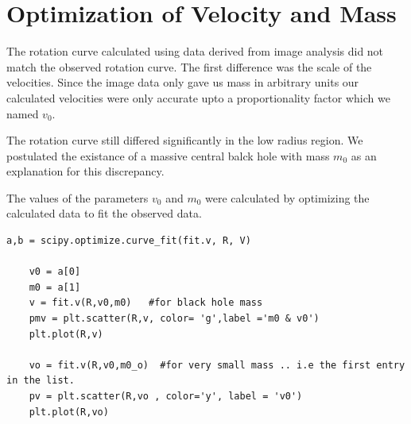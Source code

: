 \section{Optimization of Velocity and Mass}
The rotation curve calculated using data derived from image analysis did not match the observed rotation curve. The first difference was the scale of the velocities. Since the image data only gave us mass in arbitrary units our calculated velocities were only accurate upto a proportionality factor which we named $v_0$. 

The rotation curve still differed significantly in the low radius region. We postulated the existance of a massive central balck hole with mass $m_0$ as an explanation for this discrepancy.

The values of the parameters $v_0$ and $m_0$ were calculated by optimizing the calculated data to fit the observed data. 
\begin{verbatim}
a,b = scipy.optimize.curve_fit(fit.v, R, V)

    v0 = a[0]
    m0 = a[1]
    v = fit.v(R,v0,m0)   #for black hole mass
    pmv = plt.scatter(R,v, color= 'g',label ='m0 & v0')
    plt.plot(R,v)

    vo = fit.v(R,v0,m0_o)  #for very small mass .. i.e the first entry in the list.
    pv = plt.scatter(R,vo , color='y', label = 'v0')
    plt.plot(R,vo)
\end{verbatim}




